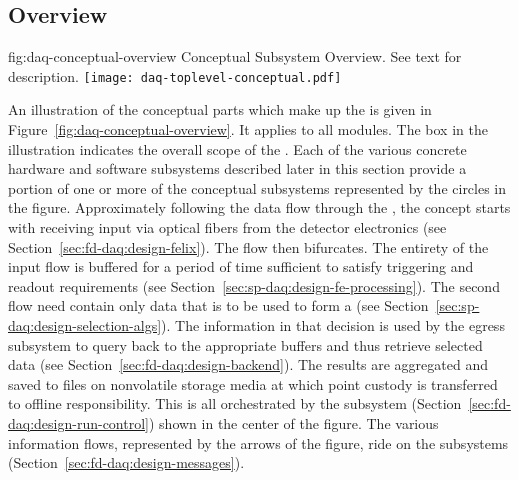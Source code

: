 \subsection{Overview}
\label{sec:fd-daq:design-overview}

\begin{dunefigure}{fig:daq-conceptual-overview}{ Conceptual
    Subsystem Overview.  See text for description.}
  \texttt{[image: daq-toplevel-conceptual.pdf]}
\end{dunefigure}


An illustration of the conceptual parts which make up the    is given in Figure~\ref{fig:daq-conceptual-overview}. 
It applies to all  modules. 
The box in the illustration indicates the overall scope of the .
Each of the various concrete hardware and software subsystems described later in this section provide a portion of one or more of the conceptual subsystems represented by the circles in the figure.
Approximately following the data flow through the , the concept starts with receiving input via optical fibers from the detector electronics (see Section~\ref{sec:fd-daq:design-felix}). 
The flow then bifurcates. 
The entirety of the input flow is buffered for a period of time sufficient to satisfy triggering and readout requirements (see Section~\ref{sec:sp-daq:design-fe-processing}). 
The second flow need contain only data that is to be used to form a  (see Section~\ref{sec:sp-daq:design-selection-algs}).
The information in that decision is used by the egress subsystem to query back to the appropriate buffers and thus retrieve selected data (see Section~\ref{sec:fd-daq:design-backend}).
The results are aggregated and saved to files on nonvolatile storage media at which point custody is transferred to offline responsibility.
This is all orchestrated by the  subsystem (Section~\ref{sec:fd-daq:design-run-control}) shown in the center of the figure.   The various information flows, represented by the arrows of the figure, ride on the  subsystems (Section~\ref{sec:fd-daq:design-messages}). 

